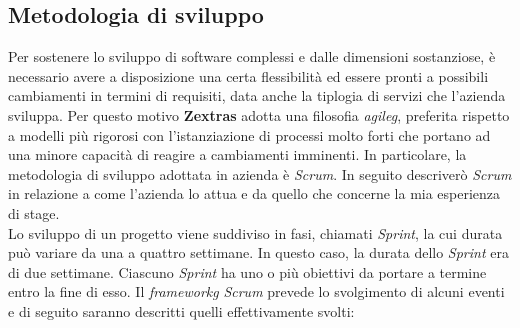\subsection{Metodologia di sviluppo}\label{sec:met_svilpuppo}
    Per sostenere lo sviluppo di software complessi e dalle dimensioni sostanziose, è necessario avere a disposizione una certa flessibilità ed essere pronti a possibili cambiamenti in termini di requisiti, data anche la tiplogia di servizi che l'azienda sviluppa. Per questo motivo \textbf{Zextras} adotta una filosofia \textit{\gls{agileg}}, preferita rispetto a modelli più rigorosi con l'istanziazione di processi molto forti che portano ad una minore capacità di reagire a cambiamenti imminenti. In particolare, la metodologia di sviluppo adottata in azienda è \textit{Scrum}. In seguito descriverò \textit{Scrum} in relazione a come l'azienda lo attua e da quello che concerne la mia esperienza di stage. \\
    Lo sviluppo di un progetto viene suddiviso in fasi, chiamati \textit{Sprint}, la cui durata può variare da una a quattro settimane. In questo caso, la durata dello \textit{Sprint} era di due settimane.
    Ciascuno \textit{Sprint} ha uno o più obiettivi da portare a termine entro la fine di esso.
    Il \textit{\gls{frameworkg}} \textit{Scrum} prevede lo svolgimento di alcuni eventi e di seguito saranno descritti quelli effettivamente svolti:
    
